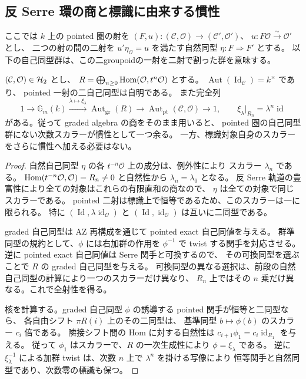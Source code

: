 \subsection{反 Serre 環の商と標識に由来する慣性}
\label{subsec:antiserre-stack-candidate}

ここでは $k$ 上の pointed 圏の射を
$(F,u):(\mathcal C,\mathcal O)\to(\mathcal C',\mathcal O')$、
$u:F\mathcal O\xrightarrow\sim\mathcal O'$ とし、
二つの射の間の二射を $u'\eta_{\mathcal O}=u$ を満たす自然同型
$\eta:F\Rightarrow F'$ とする。
以下の自己同型群は、この二groupoidの一射を二射で割った群を意味する。

\begin{lemma}[標識付き圏の二射と次数スカラー]
\label{lem:pointed-degree-scalar}
$(\mathcal C,\mathcal O)\in\mathcal H_2$ とし、
$R=\bigoplus_{n\ge0}\operatorname{Hom}(\mathcal O,t^n\mathcal O)$ とする。
$\operatorname{Aut}(\operatorname{Id}_{\mathcal C})=k^\times$ であり、
pointed 一射の二自己同型は自明である。
また完全列
\[
 1\longrightarrow\mathbb G_m(k)
 \xrightarrow{\lambda\mapsto\xi_\lambda}
 \operatorname{Aut}_{\mathrm{gr}}(R)
 \longrightarrow
 \operatorname{Aut}_{\mathrm{pt}}(\mathcal C,\mathcal O)
 \longrightarrow1,
 \qquad \xi_\lambda|_{R_n}=\lambda^n\operatorname{id}
\]
がある。従って graded algebra の商をそのまま用いると、
pointed 圏の自己同型群にない次数スカラーが慣性として一つ余る。
一方、標識対象自身のスカラーをさらに慣性へ加える必要はない。
\end{lemma}

\begin{proof}
自然自己同型 $\eta$ の各 $t^{-n}\mathcal O$ 上の成分は、例外性により
スカラー $\lambda_n$ である。
$\operatorname{Hom}(t^{-n}\mathcal O,\mathcal O)=R_n\ne0$ と自然性から
$\lambda_n=\lambda_0$ となる。
反 Serre 軌道の豊富性により全ての対象はこれらの有限直和の商なので、
$\eta$ は全ての対象で同じスカラーである。
pointed 二射は標識上で恒等であるため、このスカラーは一に限られる。
特に $(\operatorname{Id},\lambda\operatorname{id}_{\mathcal O})$ と
$(\operatorname{Id},\operatorname{id}_{\mathcal O})$ は互いに二同型である。

graded 自己同型は AZ 再構成を通じて pointed exact 自己同値を与える。
群準同型の規約として、$\phi$ には右加群の作用を $\phi^{-1}$ で twist する関手を対応させる。
逆に pointed exact 自己同値は Serre 関手と可換するので、
その可換同型を選ぶことで $R$ の graded 自己同型を与える。
可換同型の異なる選択は、前段の自然自己同型の計算により一つのスカラーだけ異なり、
$R_n$ 上ではその $n$ 乗だけ異なる。これで全射性を得る。

核を計算する。graded 自己同型 $\phi$ の誘導する pointed 関手が恒等と二同型なら、
各自由シフト $\pi R(i)$ 上のその二同型は、
基準同型 $b\mapsto\phi(b)$ のスカラー $c_i$ 倍である。
隣接シフト間の Hom に対する自然性は
$c_{i+1}\phi_1=c_i\operatorname{id}_{R_1}$ を与える。
従って $\phi_1$ はスカラーで、$R$ の一次生成性により $\phi=\xi_\lambda$ である。
逆に $\xi_\lambda^{-1}$ による加群 twist は、次数 $n$ 上で $\lambda^n$ を掛ける写像により
恒等関手と自然同型であり、次数零の標識も保つ。
\end{proof}

